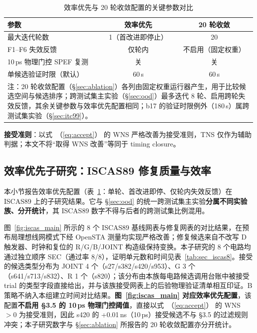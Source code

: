 \documentclass[twocolumn,10pt,fontset=windows]{ctexart}
\renewcommand{\eqref}[1]{\textup{（\ref{#1}）}}
\begin{document}
\begin{table}[!htb]
\centering
\caption{效率优先与 20 轮收敛配置的关键参数对比}
\label{tab:configs}
\scriptsize
\setlength{\tabcolsep}{4pt}
\begin{tabular}{lcc}
\toprule
\textbf{参数} & \textbf{效率优先} & \textbf{20 轮收敛} \\
\midrule
最大迭代轮数                    & 1（首改进即停止） & 20 \\
F1--F6 失效反馈                  & 仅轮内 & 不启用（固定权重） \\
10\,ps 物理门控 SPEF 复测        & 关 & 关 \\
单候选验证时限（默认）           & 60\,s & 60\,s \\
\bottomrule
\multicolumn{3}{p{0.95\columnwidth}}{\footnotesize 注：20 轮收敛配置（\S\ref{sec:ablation}）各列由固定权重运行器产生，用于比较候选空间与候选排序；跨测试集主实验（\S\ref{sec:ood}）最多迭代 8 轮、启用跨轮失效反馈，其余关键参数与效率优先配置相同；b17 的验证时限例外（180\,s）属跨测试集实验（\S\ref{sec:itc99}）。}\\
\end{tabular}
\end{table}

\textbf{接受准则}：以式~\eqref{eq:accept} 的 WNS 严格改善为接受准则，TNS 仅作为辅助判据；本文不将“取得 WNS 改善”等同于 timing closure。

\subsection{效率优先子研究：ISCAS89 修复质量与效率}\label{sec:iscas}

本小节报告效率优先配置（表~\ref{tab:configs}：单轮、首改进即停、仅轮内失效反馈）在 ISCAS89 上的子研究结果。它与 \S\ref{sec:ood} 的统一跨测试集主实验\textbf{分属不同实验族、分开统计}，其 ISCAS89 数字不得与后者的跨测试集比例混用。

图~\ref{fig:iscas_main} 所示的 8 个 ISCAS89 基线网表与修复网表的对比结果，在预布局理想线网模式下经 OpenSTA 测量均实现严格改善；修复候选来自不改写 D 触发器、时钟和复位的 R/G/B/JOINT 构造级保持变换。本子研究的 8 个电路均通过独立顺序 SEC（通过率 8/8），证明单元数和时间见表~\ref{tab:sec_iscas8}。接受的候选类型分布为 JOINT 4 个（s27/s382/s420/s953）、G 3 个（s641/s713/s832）、R 1 个（s820）；该分布由本族每电路候选调用台账中被接受 trial 的类型字段直接给出，并与该族接受网表上的后验物理验证清单相互印证。B 策略不纳入本组建立时间对比结果。\textbf{图~\ref{fig:iscas_main} 对应效率优先配置}\label{sec:eff_prio}，该配置\textbf{不启用 §3.5 的 10\,ps 物理门控阈值}，直接以式~\eqref{eq:accept} 的 WNS$>0$ 为接受准则，因此 s420 的 +0.01\,ns（10\,ps）接受候选不与 §3.5 的过滤规则冲突；本子研究数字与 \S\ref{sec:ablation} 所报告的 20 轮收敛配置亦分开统计。
\end{document}
